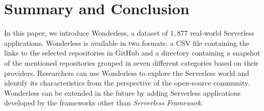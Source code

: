 \section{Summary and Conclusion}
\label{summary}

In this paper, we introduce Wonderless, a dataset of $1,877$ 
real-world Serverless applications. Wonderless is available in two 
formats: a CSV file containing the links to the selected repositories 
in GitHub and a directory containing a snapshot of the mentioned 
repositories grouped in seven different categories based on their providers. 
Researchers can use Wonderless to explore the Serverless world and 
identify its characteristics from the perspective of the open-source 
community. Wonderless can be extended in the future by adding 
Serverless applications developed by the frameworks other than 
\emph{Serverless Framework}.

